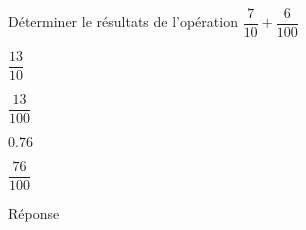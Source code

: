 \begin{exercice}
    Déterminer le résultats de l'opération $\dfrac{7}{10}+\dfrac{6}{100}$
    \begin{ChoixQCM}{4}
        \item $\dfrac{13}{10}$
        \item $\dfrac{13}{100}$
        \item $\num{0.76}$
        \item $\dfrac{76}{100}$
    \end{ChoixQCM}
\end{exercice}
\begin{corrige}
    Réponse  
\end{corrige}